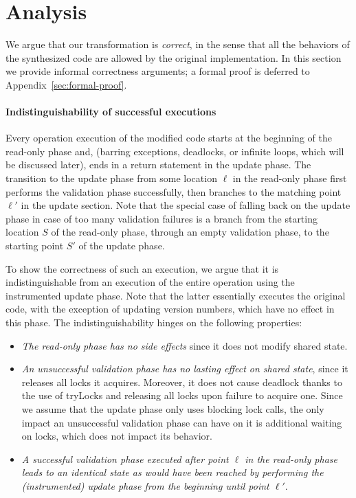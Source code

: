 \newcommand{\op}{\emph{\textsc{op}}}
\newcommand{\opt}{\textsc{opt}}

\section{Analysis}
\label{sec:proof}


We argue that our transformation is \emph{correct}, in the sense that all the behaviors of 
the synthesized code are allowed by the original implementation.
In this section we provide informal correctness arguments; a formal proof is deferred to Appendix~\ref{sec:formal-proof}.

\paragraph{Indistinguishability of successful executions}
Every operation execution of the modified code starts at the beginning of the read-only phase and, 
(barring exceptions, deadlocks, or infinite loops, which will be discussed later), 
ends in a return statement in the update phase. The transition to the update phase 
from some location $\ell$ in the read-only phase first performs the validation phase successfully, then branches
to the matching point $\ell'$ in the update section. Note that the special case of falling back on the update phase in case of too
many validation failures is a branch from the starting location $S$ of the read-only phase, 
through an empty validation phase, to the starting point $S'$ of the update phase.

To show the correctness of such an execution, we argue that it is indistinguishable from an execution of the entire
operation using the instrumented update phase. Note that the latter essentially executes the original code, 
with the exception of updating version numbers, which have no effect in this phase.
%
The indistinguishability hinges on the following properties:
\begin{itemize}
\item \emph{The read-only phase has no side effects} since it does not modify shared state.
\item \emph{An unsuccessful validation phase has no lasting effect on shared state}, 
since it releases all locks it acquires. Moreover, it does not cause deadlock thanks to the use of tryLocks 
and releasing all locks	upon failure to acquire one. Since we assume that the update phase only uses 
blocking lock calls, the only impact an unsuccessful validation phase can have on it is additional waiting
on locks, which does not impact its behavior. 
\item  \emph{A successful validation phase executed after point $\ell$ in the read-only phase leads to 
an identical state as would have been reached by performing the (instrumented)
update phase from the beginning until point $\ell'$}.
\end{itemize}

